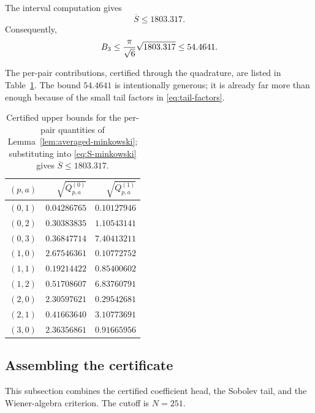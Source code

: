 \begin{lemma}\label{lem:B3-certified}
The interval computation gives
\[
  \overline S\le1803.317.
\]
Consequently,
\[
  B_3\le{\pi\over\sqrt6}\sqrt{1803.317}\le54.4641.
\]
\end{lemma}

The per-pair contributions, certified through the quadrature, are listed in Table~\ref{tab:Q}.  The bound $54.4641$ is intentionally generous; it is already far more than enough because of the small tail factors in \eqref{eq:tail-factors}.

\begin{table}[t]\centering
\small
\begin{tabular}{c r r}
\toprule
$(p,a)$ & $\sqrt{Q^{(0)}_{p,a}}$ & $\sqrt{Q^{(1)}_{p,a}}$ \\
\midrule
$(0,1)$ & $0.04286765$ & $0.10127946$ \\
$(0,2)$ & $0.30383835$ & $1.10543141$ \\
$(0,3)$ & $0.36847714$ & $7.40413211$ \\
$(1,0)$ & $2.67546361$ & $0.10772752$ \\
$(1,1)$ & $0.19214422$ & $0.85400602$ \\
$(1,2)$ & $0.51708607$ & $6.83760791$ \\
$(2,0)$ & $2.30597621$ & $0.29542681$ \\
$(2,1)$ & $0.41663640$ & $3.10773691$ \\
$(3,0)$ & $2.36356861$ & $0.91665956$ \\
\bottomrule
\end{tabular}
\caption{Certified upper bounds for the per-pair quantities of Lemma~\ref{lem:averaged-minkowski}; substituting into \eqref{eq:S-minkowski} gives $\overline S\le1803.317$.}
\label{tab:Q}
\end{table}



\subsection{Assembling the certificate}\label{sec:assembly}

This subsection combines the certified coefficient head, the Sobolev tail, and the Wiener-algebra criterion.  The cutoff is $N=251$.

